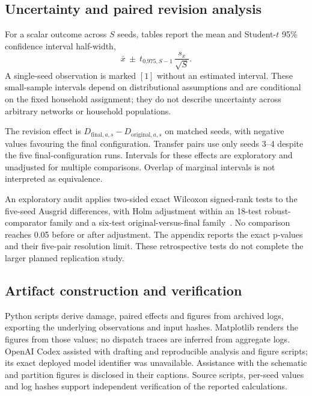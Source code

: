 \subsection{Uncertainty and paired revision analysis}
For a scalar outcome across $S$ seeds, tables report the mean and Student-$t$ 95\% confidence interval half-width,
\begin{equation}
\bar x\ \pm\ t_{0.975,S-1}\,\frac{s_x}{\sqrt S}.
\end{equation}
A single-seed observation is marked $[1]$ without an estimated interval. These small-sample intervals depend on distributional assumptions and are conditional on the fixed household assignment; they do not describe uncertainty across arbitrary networks or household populations.

The revision effect is $D_{\mathrm{final},a,s}-D_{\mathrm{original},a,s}$ on matched seeds, with negative values favouring the final configuration. Transfer pairs use only seeds 3--4 despite the five final-configuration runs. Intervals for these effects are exploratory and unadjusted for multiple comparisons. Overlap of marginal intervals is not interpreted as equivalence.

An exploratory audit applies two-sided exact Wilcoxon signed-rank tests to the five-seed Ausgrid differences, with Holm adjustment within an 18-test robust-comparator family and a six-test original-versus-final family~\cite{scipywilcoxon,holm}. No comparison reaches 0.05 before or after adjustment. The appendix reports the exact p-values and their five-pair resolution limit. These retrospective tests do not complete the larger planned replication study.

\subsection{Artifact construction and verification}
Python scripts derive damage, paired effects and figures from archived logs, exporting the underlying observations and input hashes. Matplotlib renders the figures from those values; no dispatch traces are inferred from aggregate logs. OpenAI Codex assisted with drafting and reproducible analysis and figure scripts; its exact deployed model identifier was unavailable. Assistance with the schematic and partition figures is disclosed in their captions. Source scripts, per-seed values and log hashes support independent verification of the reported calculations.
